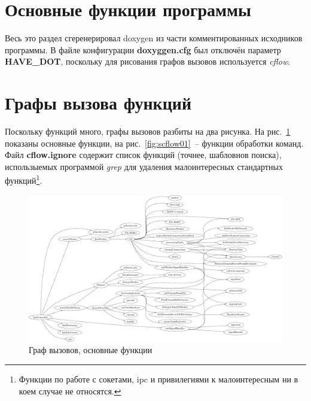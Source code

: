 \documentclass[a4paper,12pt]{report}
\begin{document}
\section{Основные функции программы}

Весь это раздел сгеренерировал doxygen из части комментированных исходников программы. В файле конфигурации \textbf{doxyggen.cfg} был отключён параметр \textbf{HAVE\_DOT}, поскольку для рисования графов вызовов используется \textit{cflow}.

% 

% 
% 
% 
% 
% 
% 
% 
% 
% 
% 


\section{Графы вызова функций}

Поскольку функций много, графы вызовов разбиты на два рисунка. На рис.~\ref{fig:ccflow01} показаны основные функции, на рис.~\ref{fig:scflow01}~-- функции обработки команд. Файл \textbf{cflow.ignore} содержит список функций (точнее, шабловнов поиска), использыемых программой \textit{grep} для удаления малоинтересных стандартных функций\footnote{Функции по работе с сокетами, ipc и привилегиями к малоинтересным ни в коем случае не относятся.}.

\begin{figure}
\centering
\includegraphics[width=\textwidth]{include/ccflow01_dot.pdf}
\caption{Граф вызовов, основные функции}
\label{fig:ccflow01}
\end{figure}
\end{document}
